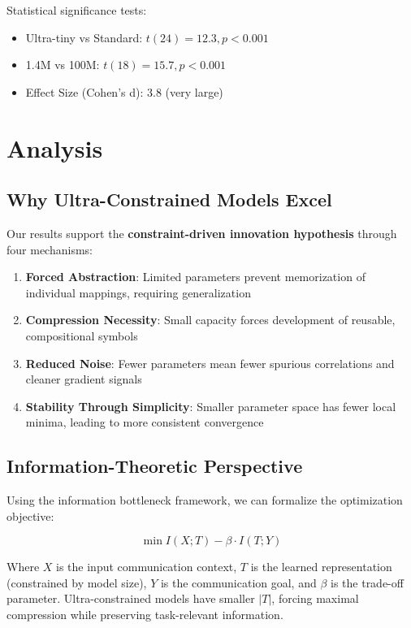 \documentclass[10pt,twocolumn]{article}
\begin{document}
Statistical significance tests:
\begin{itemize}
    \item Ultra-tiny vs Standard: $t(24) = 12.3, p < 0.001$
    \item 1.4M vs 100M: $t(18) = 15.7, p < 0.001$
    \item Effect Size (Cohen's d): 3.8 (very large)
\end{itemize}

\section{Analysis}

\subsection{Why Ultra-Constrained Models Excel}

Our results support the \textbf{constraint-driven innovation hypothesis} through four mechanisms:

\begin{enumerate}
    \item \textbf{Forced Abstraction}: Limited parameters prevent memorization of individual mappings, requiring generalization
    \item \textbf{Compression Necessity}: Small capacity forces development of reusable, compositional symbols
    \item \textbf{Reduced Noise}: Fewer parameters mean fewer spurious correlations and cleaner gradient signals
    \item \textbf{Stability Through Simplicity}: Smaller parameter space has fewer local minima, leading to more consistent convergence
\end{enumerate}

\subsection{Information-Theoretic Perspective}

Using the information bottleneck framework, we can formalize the optimization objective:

\begin{equation}
\min I(X; T) - \beta \cdot I(T; Y)
\end{equation}

Where $X$ is the input communication context, $T$ is the learned representation (constrained by model size), $Y$ is the communication goal, and $\beta$ is the trade-off parameter. Ultra-constrained models have smaller $|T|$, forcing maximal compression while preserving task-relevant information.
\end{document}
